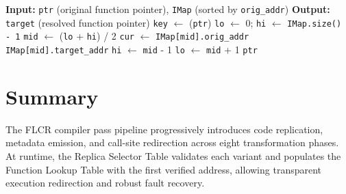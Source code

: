 \begin{algorithm}[H]
\caption{\texttt{resolve(ptr)} — Binary search in IMap}
\label{alg:resolve-bsearch}
\begin{algorithmic}[1]
\State \textbf{Input:} \texttt{ptr} (original function pointer), \texttt{IMap} (sorted by \texttt{orig\_addr})
\State \textbf{Output:} \texttt{target} (resolved function pointer)
\State \texttt{key} $\gets$ (\texttt{ptr}) 
\State \texttt{lo} $\gets$ 0;\; \texttt{hi} $\gets$ \texttt{IMap.size() - 1}
  \State \texttt{mid} $\gets$ (\texttt{lo} + \texttt{hi}) / 2
  \State \texttt{cur} $\gets$ \texttt{IMap[mid].orig\_addr}
    \State \Return \texttt{IMap[mid].target\_addr}
    \State \texttt{hi} $\gets$ \texttt{mid} - 1
  \Else
    \State \texttt{lo} $\gets$ \texttt{mid} + 1
  \EndIf
\EndWhile
\State \Return \texttt{ptr} 
\end{algorithmic}
\end{algorithm}

\section*{Summary}
The FLCR compiler pass pipeline progressively introduces code replication,
metadata emission, and call-site redirection across eight transformation phases.
At runtime, the Replica Selector Table validates each variant and populates
the Function Lookup Table with the first verified address, allowing transparent
execution redirection and robust fault recovery.
